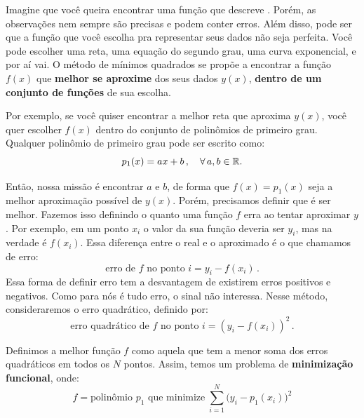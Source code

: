 \documentclass[12pt]{report}
\begin{document}
	Imagine que você queira encontrar uma função que descreve . Porém, as observações nem sempre são precisas e podem conter erros. Além disso, pode ser que a função que você escolha pra representar seus dados não seja perfeita. Você pode escolher uma reta, uma equação do segundo grau, uma curva exponencial, e por aí vai. O método de mínimos quadrados se propõe a encontrar a função $f(x)$ que \textbf{melhor se aproxime} dos seus dados $y(x)$, \textbf{dentro de um conjunto de funções} de sua escolha.
	
	Por exemplo, se você quiser encontrar a melhor reta que aproxima $y(x)$, você quer escolher $f(x)$ dentro do conjunto de polinômios de primeiro grau. Qualquer polinômio de primeiro grau pode ser escrito como:
	\begin{equation*}
		p_1(x) = ax + b
		\,, \quad \forall \, a, b \in \mathbb{R}.
	\end{equation*}
	
	Então, nossa missão é encontrar $a$ e $b$, de forma que $f(x)=p_1(x)$ seja a melhor aproximação possível de $y(x)$. Porém, precisamos definir que é ser melhor. Fazemos isso definindo o quanto uma função $f$ erra ao tentar aproximar $y$. Por exemplo, em um ponto $x_i$ o valor da sua função deveria ser $y_i$, mas na verdade é $f(x_i)$. Essa diferença entre o real e o aproximado é o que chamamos de erro:
	\begin{equation}
		\text{erro de $f$ no ponto $i$} 
		= y_i - f(x_i) \,.
	\end{equation}
	Essa forma de definir erro tem a desvantagem de existirem erros positivos e negativos. Como para nós é tudo erro, o sinal não interessa. Nesse método, consideraremos o erro quadrático, definido por:
	\begin{equation}
		\text{erro quadrático de $f$ no ponto $i$} 
		= (y_i - f(x_i))^2 \,.
	\end{equation}
	
	Definimos a melhor função $f$ como aquela que tem a menor soma dos erros quadráticos em todos os $N$ pontos. Assim, temos um problema de \textbf{minimização funcional}, onde:
	\begin{equation}
		f = \text{polinômio $p_1$ que minimize}		
		\;\sum_{i=1}^{N} \big(y_i - p_1(x_i) \big)^2
	\end{equation}
\end{document}
